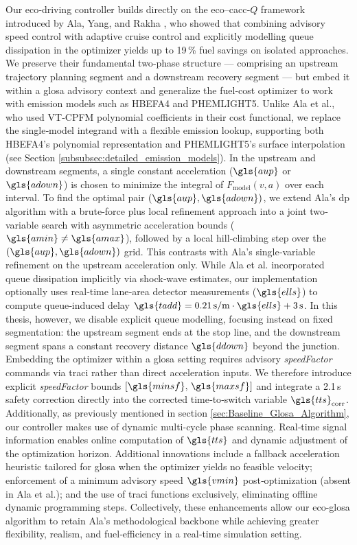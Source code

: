 Our eco‐driving controller builds directly on the eco–\ac{cacc}‐$Q$ framework introduced by Ala, Yang, and Rakha \cite{Ala2016}, who showed that combining advisory speed control with adaptive cruise control and explicitly modelling queue dissipation in the optimizer yields up to 19\,\% fuel savings on isolated approaches. We preserve their fundamental two‐phase structure --- comprising an upstream trajectory planning segment and a downstream recovery segment --- but embed it within a \ac{glosa} advisory context and generalize the fuel‐cost optimizer to work with emission models such as HBEFA4 and PHEMLIGHT5. 
\mynewline
Unlike Ala et al., who used VT‐CPFM polynomial coefficients in their cost functional, we replace the single‐model integrand with a flexible emission lookup, supporting both HBEFA4’s polynomial representation and PHEMLIGHT5’s surface interpolation (see Section \ref{subsubsec:detailed_emission_models}). In the upstream and downstream segments, a single constant acceleration ($\gls{aup}$ or $\gls{adown}$) is chosen to minimize the integral of $F_{\mathrm{model}}(v,a)$ over each interval. To find the optimal pair $(\gls{aup},\gls{adown})$, we extend Ala’s \ac{dp} algorithm with a brute‐force plus local refinement approach into a joint two‐variable search with asymmetric acceleration bounds ($\gls{amin}\neq\gls{amax}$), followed by a local hill‐climbing step over the $(\gls{aup},\gls{adown})$ grid. This contrasts with Ala’s single‐variable refinement on the upstream acceleration only.
\mynewline
While Ala et al. incorporated queue dissipation implicitly via shock‐wave estimates, our implementation optionally uses real‐time lane‐area detector measurements ($\gls{ells}$) to compute queue‐induced delay $\gls{tadd} = 0.21\,\text{s/m} \cdot \gls{ells} + 3\,\text{s}$. In this thesis, however, we disable explicit queue modelling, focusing instead on fixed segmentation: the upstream segment ends at the stop line, and the downstream segment spans a constant recovery distance $\gls{ddown}$ beyond the junction. 
\mynewline
Embedding the optimizer within a \ac{glosa} setting requires advisory \textit{speedFactor} commands via \ac{traci} rather than direct acceleration inputs. We therefore introduce explicit \textit{speedFactor} bounds $[\gls{minsf},\,\gls{maxsf}]$ and integrate a 2.1\,s safety correction directly into the corrected time‐to‐switch variable $\gls{tts}_{\mathrm{corr}}$. Additionally, as previously mentioned in section \ref{sec:Baseline_Glosa_Algorithm}, our controller makes use of dynamic multi-cycle phase scanning. Real‐time signal information enables online computation of $\gls{tts}$ and dynamic adjustment of the optimization horizon.
\newline
Additional innovations include a fallback acceleration heuristic tailored for \ac{glosa} when the optimizer yields no feasible velocity; enforcement of a minimum advisory speed $\gls{vmin}$ post‐optimization (absent in Ala et al.); and the use of \ac{traci} functions exclusively, eliminating offline dynamic programming steps. Collectively, these enhancements allow our \ac{eco-glosa} algorithm to retain Ala’s methodological backbone while achieving greater flexibility, realism, and fuel‐efficiency in a real‐time simulation setting.



